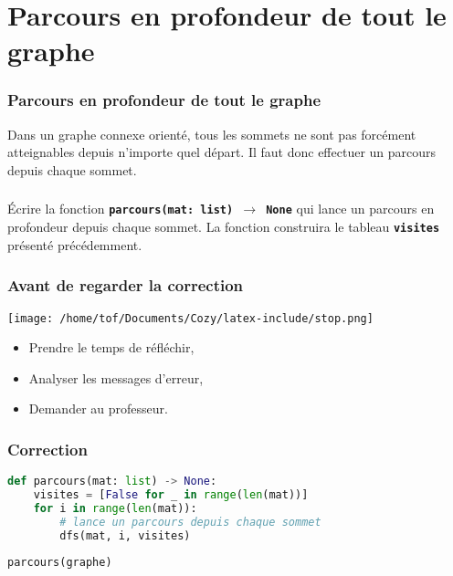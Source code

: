 \documentclass[svgnames,11pt]{beamer}
\begin{document}
\section{Parcours en profondeur de tout le graphe}
\begin{frame}
    \frametitle{Parcours en profondeur de tout le graphe}

    Dans un graphe connexe orienté, tous les sommets ne sont pas forcément atteignables depuis n'importe quel départ. Il faut donc effectuer un parcours depuis chaque sommet.

\end{frame}
\begin{frame}
    \frametitle{}
\begin{activite}
    Écrire la fonction \textbf{\texttt{parcours(mat: list) $\rightarrow$ None}} qui lance un parcours en profondeur depuis chaque sommet. La fonction construira le tableau \textbf{\texttt{visites}} présenté précédemment.
\end{activite}
    

\end{frame}
\begin{frame}
    \frametitle{Avant de regarder la correction}
\begin{center}
    \centering
    \texttt{[image: /home/tof/Documents/Cozy/latex-include/stop.png]}
    \end{center}
{\Large
    \begin{itemize}
        \item Prendre le temps de réfléchir,
        \item Analyser les messages d'erreur,
        \item Demander au professeur.
    \end{itemize}
}
\end{frame}
\begin{frame}[fragile]
    \frametitle{Correction}

\begin{center}
\begin{lstlisting}[language=Python , basicstyle=\ttfamily\small, xleftmargin=0.2em, xrightmargin=0em]
def parcours(mat: list) -> None:
    visites = [False for _ in range(len(mat))]
    for i in range(len(mat)):
        # lance un parcours depuis chaque sommet
        dfs(mat, i, visites)
\end{lstlisting}
\end{center}
\begin{center}
\begin{lstlisting}[language=Python , basicstyle=\ttfamily\small, xleftmargin=0.2em, xrightmargin=0em]
parcours(graphe)
\end{lstlisting}
\label{CODE}
\end{center}
\end{frame}
\end{document}

